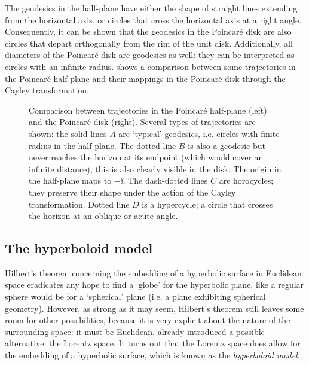 The geodesics in the half-plane have either the shape of straight lines extending from the horizontal axis, or circles that cross the horizontal axis at a right angle. Consequently, it can be shown that the geodesics in the Poincaré disk are also circles that depart orthogonally from the rim of the unit disk. Additionally, all diameters of the Poincaré disk are geodesics as well: they can be interpreted as circles with an infinite radius.  shows a comparison between some trajectories in the Poincaré half-plane and their mappings in the Poincaré disk through the Cayley transformation.

\begin{figure}[ht]
    \centering
    
    \label{fig:halfplane_disk}
    \caption{Comparison between trajectories in the Poincaré half-plane (left) and the Poincaré disk (right). Several types of trajectories are shown: the solid lines \(A\) are `typical' geodesics, i.e. circles with finite radius in the half-plane. The dotted line \(B\) is also a geodesic but never reaches the horizon at its endpoint (which would cover an infinite distance), this is also clearly visible in the disk. The origin in the half-plane maps to \(-\ii\). The dash-dotted lines \(C\) are horocycles; they preserve their shape under the action of the Cayley transformation. Dotted line \(D\) is a hypercycle; a circle that crosses the horizon at an oblique or acute angle.}
\end{figure}

\subsection{The hyperboloid model}
\label{ssec:hyperboloid}
Hilbert's theorem concerning the embedding of a hyperbolic surface in Euclidean space eradicates any hope to find a `globe' for the hyperbolic plane, like a regular sphere would be for a `spherical' plane (i.e. a plane exhibiting spherical geometry). However, as strong as it may seem, Hilbert's theorem still leaves some room for other possibilities, because it is very explicit about the nature of the surrounding space: it must be Euclidean.  already introduced a possible alternative: the Lorentz space. It turns out that the Lorentz space does allow for the embedding of a hyperbolic surface, which is known as the \emph{hyperboloid model}.

